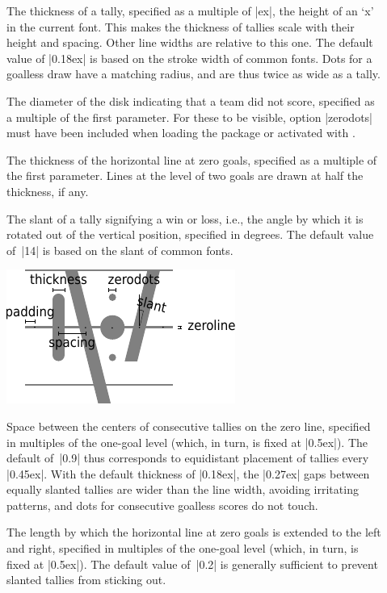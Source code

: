 \documentclass[a4paper,12pt]{ltxdoc}
\begin{document}
\begin{description}
\item[] The thickness of a tally,
  specified as a multiple of |ex|, the height of an `x' in the current font.
  This makes the thickness of tallies scale with their height and spacing.
  Other line widths are relative to this one. 
  The default value of |0.18ex| is based on the stroke width of common fonts.
  Dots for a goalless draw have a matching radius,
  and are thus twice as wide as a tally.
\item[] The diameter of the disk indicating that a team did not score,
  specified as a multiple of the first parameter. 
  For these to be visible, option |zerodots| must have been included
  when loading the package or activated with .
\item[] The thickness of the horizontal line at zero goals,
  specified as a multiple of the first parameter.
  Lines at the level of two goals are drawn at half the thickness, if any.
\item[] The slant of a tally signifying a win or loss,
  i.e., the angle by which it is rotated out of the vertical position,
  specified in degrees.
  The default value of~|14| is based on the slant of common fonts.
  \begin{center}
    \includegraphics[width=0.4\linewidth]{settings}
  \end{center}
\item[] Space between the centers of consecutive tallies on the zero line,
  specified in multiples of the one-goal level (which, in turn, is fixed at |0.5ex|).
  The default of~|0.9| thus corresponds to equidistant placement of tallies every |0.45ex|.
  With the default thickness of |0.18ex|,
  the |0.27ex| gaps between equally slanted tallies
  are wider than the line width, avoiding irritating patterns,
  and dots for consecutive goalless scores do not touch. 
\item[] The length by which the horizontal line at zero goals
  is extended to the left and right,
  specified in multiples of the one-goal level (which, in turn, is fixed at |0.5ex|).
  The default value of~|0.2| is generally sufficient
  to prevent slanted tallies from sticking out.
\end{description}
\end{document}

